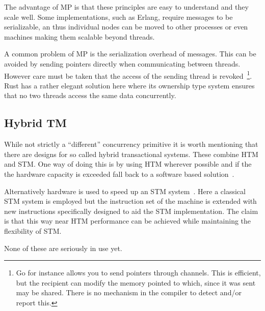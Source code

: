 The advantage of MP is that these principles are easy to understand and they
scale well. Some implementations, such as Erlang\cite{erlang}, require messages
to be serializable, an thus individual nodes can be moved to other processes or
even machines making them scalable beyond threads.

A common problem of MP is the serialization overhead of messages. This can be
avoided by sending pointers directly when communicating between threads. However
care must be taken that the access of the sending thread is revoked~\footnote{Go
  for instance allows you to send pointers through channels. This is efficient,
  but the recipient can modify the memory pointed to which, since it was sent
  may be shared. There is no mechanism in the compiler to detect and/or report
  this.}. Rust has a rather elegant solution here where its ownership type
system ensures that no two threads access the same data concurrently.

\subsection{Hybrid TM}

While not strictly a ``different'' concurrency primitive it is worth mentioning
that there are designs for so called hybrid transactional systems. These combine
HTM and STM. One way of doing this is by using HTM wherever possible and if the
the hardware capacity is exceeded fall back to a software based
solution~\cite{htm-with-stm-fallback}.

Alternatively hardware is used to speed up an STM
system~\cite{hardware-accelerated-stm}. Here a classical STM system is employed
but the instruction set of the machine is extended with new instructions
specifically designed to aid the STM implementation. The claim is that this way
near HTM performance can be achieved while maintaining the flexibility of STM.

None of these are seriously in use yet.